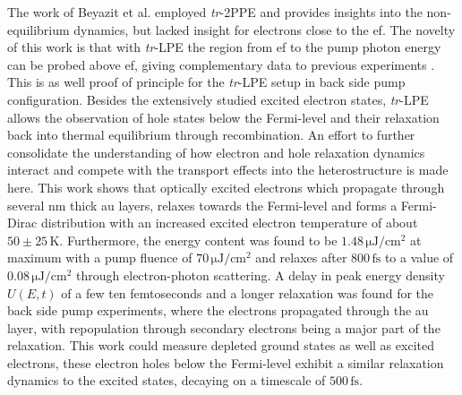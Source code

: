 \documentclass[a4paper,12pt,twoside]{article}
\begin{document}
The work of Beyazit et al. employed \textit{tr}-2PPE and provides insights into the non-equilibrium dynamics, but lacked insight for electrons close to the \gls{ef}. The novelty of this work is that with \textit{tr}-LPE the region from \gls{ef} to the pump photon energy can be probed above \gls{ef}, giving complementary data to previous experiments \cite{beyazit2019}. This is as well proof of principle for the \textit{tr}-LPE setup in back side pump configuration. Besides the extensively studied excited electron states, \textit{tr}-LPE allows the observation of hole states below the Fermi-level and their relaxation back into thermal equilibrium through recombination. An effort to further consolidate the understanding of how electron and hole relaxation dynamics interact and compete with the transport effects into the heterostructure is made here. This work shows that optically excited electrons which propagate through several nm thick \gls{au} layers, relaxes towards the Fermi-level and forms a Fermi-Dirac distribution with an increased excited electron temperature of about $50\pm25\,\mathrm{K}$. Furthermore, the energy content was found to be $1.48\,\mathrm{\mu J/cm^2}$ at maximum with a pump fluence of $70\,\mathrm{\mu J/cm^2}$ and relaxes after $800\,\mathrm{fs}$ to a value of $0.08\,\mathrm{\mu J/cm^2}$ through electron-photon scattering. A delay in peak energy density $U(E,t)$ of a few ten femtoseconds and a longer relaxation was found for the back side pump experiments, where the electrons propagated through the \gls{au} layer, with repopulation through secondary electrons being a major part of the relaxation. This work could measure depleted ground states as well as excited electrons, these electron holes below the Fermi-level exhibit a similar relaxation dynamics to the excited states, decaying on a timescale of $500\,\mathrm{fs}$.
\end{document}
